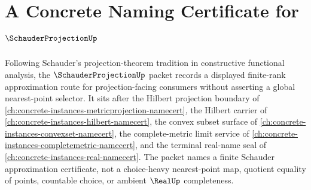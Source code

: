 \chapter{A Concrete Naming Certificate for $\SchauderProjectionUp$}
\label{ch:concrete-instances-schauder-projection-namecert}

Following Schauder's projection-theorem tradition in constructive functional analysis, the $\SchauderProjectionUp$ packet records a displayed finite-rank approximation route for projection-facing consumers without asserting a global nearest-point selector. It sits after the Hilbert projection boundary of \autoref{ch:concrete-instances-metricprojection-namecert}, the Hilbert carrier of \autoref{ch:concrete-instances-hilbert-namecert}, the convex subset surface of \autoref{ch:concrete-instances-convexset-namecert}, the complete-metric limit service of \autoref{ch:concrete-instances-completemetric-namecert}, and the terminal real-name seal of \autoref{ch:concrete-instances-real-namecert}. The packet names a finite Schauder approximation certificate, not a choice-heavy nearest-point map, quotient equality of points, countable choice, or ambient $\RealUp$ completeness.


